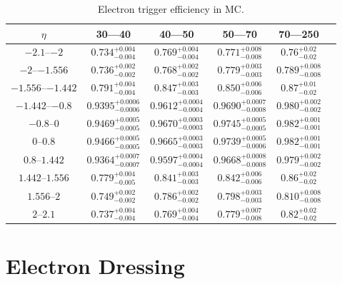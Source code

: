 \begin{table}[h]
\begin{center}
    \begin{tabular}{ | c | c | c | c | c | c |} \hline
	$\eta$ & 30---40 \GeV & 40---50 \GeV & 50---70 \GeV & 70---250 \GeV  \\ \hline
	$\numrange{-2.1}{-2}$ & $0.734^{+0.004}_{-0.004}$ & $0.769^{+0.004}_{-0.004}$ & $0.771^{+0.008}_{-0.008}$ & $0.76^{+0.02}_{-0.02}$  \\ \hline
	$\numrange{-2}{-1.556}$ & $0.736^{+0.002}_{-0.002}$ & $0.768^{+0.002}_{-0.002}$ & $0.779^{+0.003}_{-0.003}$ & $0.789^{+0.008}_{-0.008}$  \\ \hline
	$\numrange{-1.556}{-1.442}$ & $0.791^{+0.004}_{-0.004}$ & $0.847^{+0.003}_{-0.003}$ & $0.850^{+0.006}_{-0.006}$ & $0.87^{+0.01}_{-0.02}$  \\ \hline
	$\numrange{-1.442}{-0.8}$ & $0.9395^{+0.0006}_{-0.0006}$ & $0.9612^{+0.0004}_{-0.0004}$ & $0.9690^{+0.0007}_{-0.0008}$ & $0.980^{+0.002}_{-0.002}$  \\ \hline
	$\numrange{-0.8}{0}$ & $0.9469^{+0.0005}_{-0.0005}$ & $0.9670^{+0.0003}_{-0.0003}$ & $0.9745^{+0.0005}_{-0.0005}$ & $0.982^{+0.001}_{-0.001}$  \\ \hline
	$\numrange{0}{0.8}$ & $0.9466^{+0.0005}_{-0.0005}$ & $0.9665^{+0.0003}_{-0.0003}$ & $0.9739^{+0.0005}_{-0.0006}$ & $0.982^{+0.001}_{-0.001}$  \\ \hline
	$\numrange{0.8}{1.442}$ & $0.9364^{+0.0007}_{-0.0007}$ & $0.9597^{+0.0004}_{-0.0004}$ & $0.9668^{+0.0008}_{-0.0008}$ & $0.979^{+0.002}_{-0.002}$  \\ \hline
	$\numrange{1.442}{1.556}$ & $0.779^{+0.004}_{-0.005}$ & $0.841^{+0.003}_{-0.003}$ & $0.842^{+0.006}_{-0.006}$ & $0.86^{+0.02}_{-0.02}$  \\ \hline
	$\numrange{1.556}{2}$ & $0.749^{+0.002}_{-0.002}$ & $0.786^{+0.002}_{-0.002}$ & $0.798^{+0.003}_{-0.003}$ & $0.810^{+0.008}_{-0.008}$  \\ \hline
	$\numrange{2}{2.1}$ & $0.737^{+0.004}_{-0.004}$ & $0.769^{+0.004}_{-0.004}$ & $0.779^{+0.007}_{-0.008}$ & $0.82^{+0.02}_{-0.02}$  \\ \hline
    \end{tabular}
\end{center}
\centering
\caption{
    Electron trigger efficiency in \MADGRAPH MC.
}
\label{trigger_eff_mc}
\end{table}

\section{Electron Dressing}

